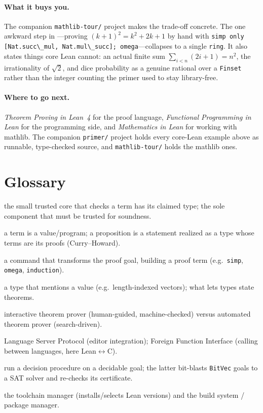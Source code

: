 \documentclass[11pt]{article}
\newcommand{\code}[1]{\lstinline[basicstyle=\ttfamily]|#1|}
\begin{document}
\paragraph{What it buys you.} The companion \texttt{mathlib-tour/} project makes
the trade-off concrete. The one awkward step in ---proving
$(k{+}1)^2 = k^2 + 2k + 1$ by hand with \code{simp only [Nat.succ\_mul,
Nat.mul\_succ]; omega}---collapses to a single \code{ring}. It also states things
core Lean cannot: an actual finite sum $\sum_{i<n}(2i+1) = n^2$, the irrationality
of $\sqrt 2$, and dice probability as a genuine rational over a \code{Finset}
rather than the integer counting the primer used to stay library-free.

\paragraph{Where to go next.} \emph{Theorem Proving in Lean~4}
\cite{avigad-tpil4} for the proof language, \emph{Functional Programming in Lean}
\cite{christiansen-fpil} for the programming side, and \emph{Mathematics in Lean}
\cite{avigad-mil} for working with mathlib. The companion \texttt{primer/} project
holds every core-Lean example above as runnable, type-checked source, and
\texttt{mathlib-tour/} holds the mathlib ones.

\section*{Glossary}
\begin{description}[leftmargin=0pt,style=nextline,itemsep=1pt]
  \item[Kernel] the small trusted core that checks a term has its claimed type;
    the sole component that must be trusted for soundness.
  \item[Term / Proposition] a term is a value/program; a proposition is a
    statement realized as a type whose terms are its proofs (Curry--Howard).
  \item[Tactic] a command that transforms the proof goal, building a proof term
    (e.g.\ \code{simp}, \code{omega}, \code{induction}).
  \item[Dependent type] a type that mentions a value (e.g.\ length-indexed
    vectors); what lets types state theorems.
  \item[ITP / ATP] interactive theorem prover (human-guided, machine-checked)
    versus automated theorem prover (search-driven).
  \item[LSP / FFI] Language Server Protocol (editor integration); Foreign
    Function Interface (calling between languages, here Lean$\leftrightarrow$C).
  \item[\texttt{decide} / \texttt{bv\_decide}] run a decision procedure on a
    decidable goal; the latter bit-blasts \texttt{BitVec} goals to a SAT solver
    and re-checks its certificate.
  \item[\texttt{elan} / \texttt{lake}] the toolchain manager (installs/selects Lean versions) and
    the build system / package manager.
\end{description}
\end{document}
